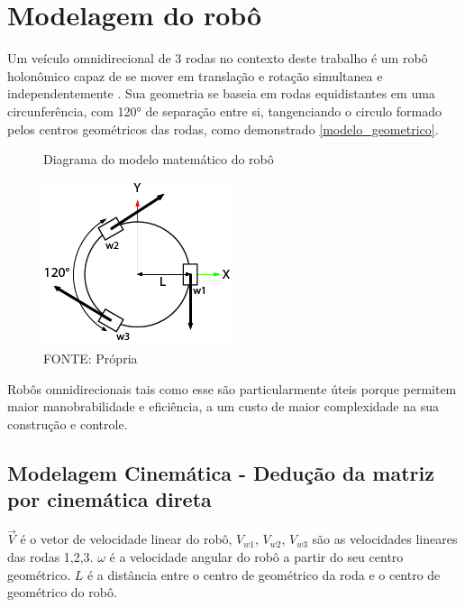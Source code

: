 
\section{Modelagem do robô}

Um veículo omnidirecional de 3 rodas no contexto deste trabalho é um robô
holonômico capaz de se mover em translação e rotação simultanea e
independentemente \cite{mobile_manipulator_robot}. Sua geometria se 
baseia em rodas equidistantes em uma circunferência, com 120° de separação entre
si, tangenciando o circulo formado pelos centros geométricos das rodas,
como demonstrado \autoref{modelo_geometrico}.

\begin{figure}[ht]
	\centering
	\caption{Diagrama do modelo matemático do robô}
	\label{modelo_geometrico}
	\includegraphics{figures/model}
	\caption*{FONTE: Própria}
\end{figure}

Robôs omnidirecionais tais como esse são particularmente úteis porque permitem
 maior manobrabilidade e eficiência, a um custo de maior complexidade na sua
 construção e controle. \cite{dynamical_models_for_omni_directional_robots}

\subsection{Modelagem Cinemática - Dedução da matriz por cinemática direta}

$\overrightarrow{V}$ é o vetor de velocidade linear do robô, $V_{w1}$, $V_{w2}$,
$V_{w3}$ são as velocidades lineares das rodas 1,2,3. 
$\omega $ é a velocidade angular do robô a partir do seu centro geométrico.
$L$ é a distância entre o centro de geométrico da roda e o centro de geométrico
do robô.

